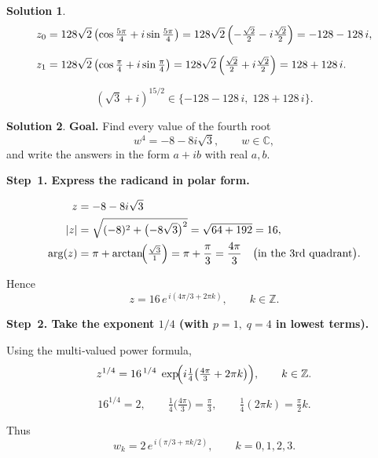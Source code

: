 \documentclass[12pt]{article}
\theoremstyle{definition} %
\newtheorem{solution}{Solution}
\theoremstyle{plain} %
\begin{document}
\begin{solution}
  \[
  \begin{aligned}
  z_0 &= 128\sqrt{2}\,
        \bigl(\cos\tfrac{5\pi}{4}+i\sin\tfrac{5\pi}{4}\bigr)
       =128\sqrt{2}\, \Bigl(-\tfrac{\sqrt{2}}{2}-i\tfrac{\sqrt{2}}{2}\Bigr)
       =-128-128\,i,
  \\[6pt]
  z_1 &= 128\sqrt{2}\,
        \bigl(\cos\tfrac{\pi}{4}+i\sin\tfrac{\pi}{4}\bigr)
       =128\sqrt{2}\, \Bigl(\tfrac{\sqrt{2}}{2}+i\tfrac{\sqrt{2}}{2}\Bigr)
       =128+128\,i.
  \end{aligned}
  \]
  
  \[
  \boxed{(\sqrt{3}+i)^{15/2}\in\{-128-128\,i,\;128+128\,i\}.}
  \]
  \end{solution}
  \begin{solution}
    \textbf{Goal.}  Find every value of the fourth root
    \[
          w^4=-8-8i\sqrt3,
          \qquad w\in\mathbb{C},
    \]
    and write the answers in the form $a+ib$ with real $a,b$.
    
    \bigskip
    \textbf{Step 1.  Express the radicand in polar form.}
    
    \vspace{-6pt}
    \begin{align*}
    z&=-8-8i\sqrt3\\
    |z|&=\sqrt{(-8)^2+\bigl(-8\sqrt3\bigr)^2}=\sqrt{64+192}=16,\\
    \arg(z)&=\pi+\arctan\!\Bigl(\tfrac{\sqrt3}{1}\Bigr)=\pi+\frac{\pi}{3}=\frac{4\pi}{3}
              \quad\bigl(\text{in the 3rd quadrant}\bigr).
    \end{align*}
    
    Hence
    \[
       z=16\,e^{\,i(4\pi/3+2\pi k)},\qquad k\in\mathbb{Z}.
    \]
    
    \bigskip
    \textbf{Step 2.  Take the exponent $1/4$ (with $p=1,\;q=4$ in lowest terms).}
    
    Using the multi‑valued power formula,
    \[
       z^{1/4}=16^{\,1/4}\;
                \exp\!\Bigl(i\tfrac14\bigl(\tfrac{4\pi}{3}+2\pi k\bigr)\Bigr),
                \qquad k\in\mathbb{Z}.
    \]
    
    \[
       16^{1/4}=2,\qquad
       \tfrac14\!\bigl(\tfrac{4\pi}{3}\bigr)=\tfrac{\pi}{3},\qquad
       \tfrac14(2\pi k)=\tfrac{\pi}{2}k.
    \]
    
    Thus
    \[
       w_k
       =2\,e^{\,i(\pi/3+\pi k/2)},\qquad k=0,1,2,3.
    \]
    

\end{solution}
\end{document}
